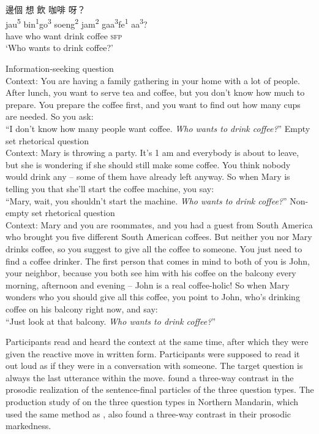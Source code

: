 \documentclass[output=paper,colorlinks,citecolor=brown            ,chinesefont]{langscibook}
\begin{document}
\begin{exe}
\ex\label{ex}  {\cn 邊個} {\cn 想} {\cn 飲} {\cn 咖啡} {\cn 呀}？\\
jau\textsuperscript{5} bin\textsuperscript{1}go\textsuperscript{3} soeng\textsuperscript{2} jam\textsuperscript{2} gaa\textsuperscript{3}fe\textsuperscript{1} aa\textsuperscript{3}? \\
have who want drink coffee \textsc{sfp}\\
\glt `Who wants to drink coffee?'
\begin{xlist}
\ex\label{exISQ} Information-seeking question\\
Context: You are having a family gathering in your home with a lot of people. After lunch, you want to serve tea and coffee, but you don't know how much to prepare. You prepare the coffee first, and you want to find out how many cups are needed. So you ask:\\
``I don't know how many people want coffee. \textit{Who wants to drink coffee?}''
\ex\label{exRQminus} Empty set rhetorical question\\
Context: Mary is throwing a party. It's 1 am and everybody is about to leave, but she is wondering if she should still make some coffee. You think nobody would drink any  --  some of them have already left anyway. So when Mary is telling you that she'll start the coffee machine, you say:\\
``Mary, wait, you shouldn't start the machine. \textit{Who wants to drink coffee?}''
\ex\label{exRQplus} Non-empty set rhetorical question\\
Context: Mary and you are roommates, and you had a guest from South America who brought you five different South American coffees. But neither you nor Mary drinks coffee, so you suggest to give all the coffee to someone. You just need to find a coffee drinker. The first person that comes in mind to both of you is John, your neighbor, because you both see him with his coffee on the balcony every morning, afternoon and evening  --  John is a real coffee-holic! So when Mary wonders who you should give all this coffee, you point to John, who's drinking coffee on his balcony right now, and say:\\
``Just look at that balcony. \textit{Who wants to drink coffee?}'' \hfill \citep{Lo+2019}
\end{xlist}
\end{exe}

\largerpage
\let\eachwordon=\upshape

Participants read and heard the context at the same time, after which they were given the reactive move in written form. Participants were supposed to read it out loud as if they were in a conversation with someone. The target question is always the last utterance within the move. \citet{Lo+2019} found a three-way contrast in the prosodic realization of the sentence-final particles of the three question types. The production study of \citet{Lo+2020} on the three question types in Northern Mandarin, which used the same method as \citet{Lo+2019}, also found a three-way contrast in their prosodic markedness. 
\end{document}
